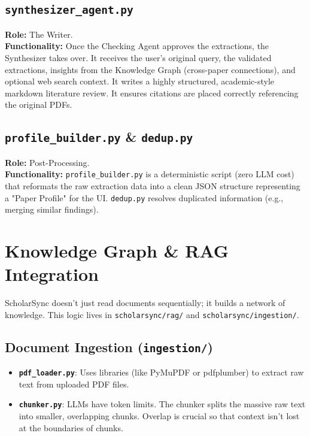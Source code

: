 \documentclass[12pt, a4paper]{report}
\begin{document}
\section{\texttt{synthesizer\_agent.py}}
\textbf{Role:} The Writer.\\
\textbf{Functionality:} Once the Checking Agent approves the extractions, the Synthesizer takes over. It receives the user's original query, the validated extractions, insights from the Knowledge Graph (cross-paper connections), and optional web search context. It writes a highly structured, academic-style markdown literature review. It ensures citations are placed correctly referencing the original PDFs.

\section{\texttt{profile\_builder.py} \& \texttt{dedup.py}}
\textbf{Role:} Post-Processing.\\
\textbf{Functionality:} \texttt{profile\_builder.py} is a deterministic script (zero LLM cost) that reformats the raw extraction data into a clean JSON structure representing a "Paper Profile" for the UI. \texttt{dedup.py} resolves duplicated information (e.g., merging similar findings).

\newpage

\chapter{Knowledge Graph \& RAG Integration}

ScholarSync doesn't just read documents sequentially; it builds a network of knowledge. This logic lives in \texttt{scholarsync/rag/} and \texttt{scholarsync/ingestion/}.

\section{Document Ingestion (\texttt{ingestion/})}
\begin{itemize}
    \item \textbf{\texttt{pdf\_loader.py}}: Uses libraries (like PyMuPDF or pdfplumber) to extract raw text from uploaded PDF files.
    \item \textbf{\texttt{chunker.py}}: LLMs have token limits. The chunker splits the massive raw text into smaller, overlapping chunks. Overlap is crucial so that context isn't lost at the boundaries of chunks.
\end{itemize}
\end{document}
